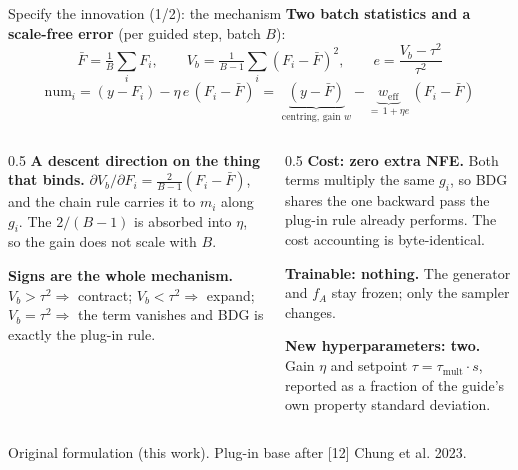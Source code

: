 \documentclass[aspectratio=169,10pt]{beamer}
\newcommand{\theslidelabel}{}
\newcommand{\lbl}[1]{\renewcommand{\theslidelabel}{#1}}
\newcommand{\srcs}[1]{\vfill{\raggedleft\color{grayt}\fontsize{4.9}{5.6}\selectfont #1\par}}
\newcommand{\Fbar}{\bar{F}}
\newcommand{\weff}{w_{\mathrm{eff}}}
\newcommand{\Vb}{V_{b}}
\begin{document}
\lbl{2c}
\begin{frame}{Specify the innovation (1/2): the mechanism}
  \textbf{Two batch statistics and a scale-free error} (per guided step, batch $B$):
  \[ \Fbar=\tfrac1B\textstyle\sum_i F_i,\qquad
     \Vb=\tfrac{1}{B-1}\textstyle\sum_i(F_i-\Fbar)^2,\qquad
     e=\frac{\Vb-\tau^2}{\tau^2} \]
  \[ \boxed{\;\mathrm{num}_i=(y-F_i)-\eta\,e\,(F_i-\Fbar)
     \;=\;\underbrace{(y-\Fbar)}_{\text{centring, gain }w}
      -\underbrace{\weff}_{=\,1+\eta e}\,(F_i-\Fbar)\;} \]

  \begin{columns}[T]
  \begin{column}{0.5\textwidth}
    \textbf{A descent direction on the thing that binds.}
    $\partial\Vb/\partial F_i=\tfrac{2}{B-1}(F_i-\Fbar)$, and the chain rule carries
    it to $m_i$ along $g_i$. The $2/(B-1)$ is absorbed into $\eta$, so the gain does
    not scale with $B$.
    \smallskip

    \textbf{Signs are the whole mechanism.}
    $\Vb>\tau^2\Rightarrow$ contract; $\Vb<\tau^2\Rightarrow$ expand;
    $\Vb=\tau^2\Rightarrow$ the term vanishes and BDG is exactly the plug-in rule.
  \end{column}
  \begin{column}{0.5\textwidth}
    \textbf{Cost: zero extra NFE.} Both terms multiply the same $g_i$, so BDG shares
    the one backward pass the plug-in rule already performs. The cost accounting is
    byte-identical.
    \smallskip

    \textbf{Trainable: nothing.} The generator and $f_A$ stay frozen; only the
    sampler changes.
    \smallskip

    \textbf{New hyperparameters: two.} Gain $\eta$ and setpoint
    $\tau=\tau_{\mathrm{mult}}\cdot s$, reported as a fraction of the guide's own
    property standard deviation.
  \end{column}
  \end{columns}

  \srcs{Original formulation (this work). Plug-in base after [12] Chung et al. 2023.}
\end{frame}
\end{document}
